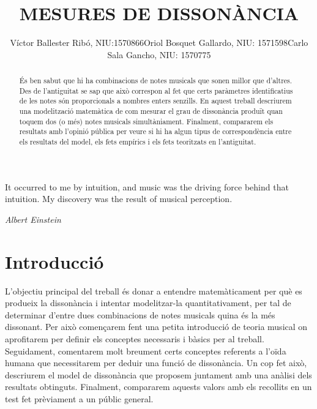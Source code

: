 \documentclass{article}
\title{\bfseries\large MESURES DE DISSONÀNCIA}
\author{Víctor Ballester Ribó, NIU:1570866\endgraf Oriol Bosquet Gallardo, NIU: 1571598\endgraf Carlo Sala Gancho, NIU: 1570775}
\date{\parbox{\linewidth}{\centering
  Taller de modelització\endgraf
  Grau en Matemàtiques\endgraf
  Universitat Autònoma de Barcelona\endgraf
  Juny de 2021}}
\theoremstyle{math}
\theoremstyle{TheoremNum}
\newcommand{\0}{\ensuremath{\vb{0}}}
\begin{document}
\maketitle
{}
\begin{abstract}
    És ben sabut que hi ha combinacions de notes musicals que sonen millor que d'altres. Des de l'antiguitat se sap que això correspon al fet que certs paràmetres identificatius de les notes són proporcionals a nombres enters senzills. En aquest treball descriurem una modelització matemàtica de com mesurar el grau de dissonància produït quan toquem dos (o més) notes musicals simultàniament. Finalment, compararem els resultats amb l'opinió pública per veure si hi ha algun tipus de correspondència entre els resultats del model, els fets empírics i els fets teoritzats en l'antiguitat. 
\end{abstract}
\thispagestyle{empty}
\newpage
\thispagestyle{empty}
\vspace*{\fill}
\vspace{-2cm}
\epigraph{It occurred to me by intuition, and music was the driving force behind that intuition. My discovery was the result of musical perception.}{\textit{Albert Einstein}}
\vspace*{\fill}
\newpage
{}
\setcounter{page}{1}
\tableofcontents
\newpage
\section{Introducció}
L'objectiu principal del treball és donar a entendre matemàticament per què es produeix la dissonància i intentar modelitzar-la quantitativament, per tal de determinar d'entre dues combinacions de notes musicals quina és la més dissonant. Per això començarem fent una petita introducció de teoria musical on aprofitarem per definir els conceptes necessaris i bàsics per al treball. Seguidament, comentarem molt breument certs conceptes referents a l'oïda humana que necessitarem per deduir una funció de dissonància. Un cop fet això, descriurem el model de dissonància que proposem juntament amb una anàlisi dels resultats obtinguts. Finalment, compararem aquests valors amb els recollits en un test fet prèviament a un públic general.
\end{document}

